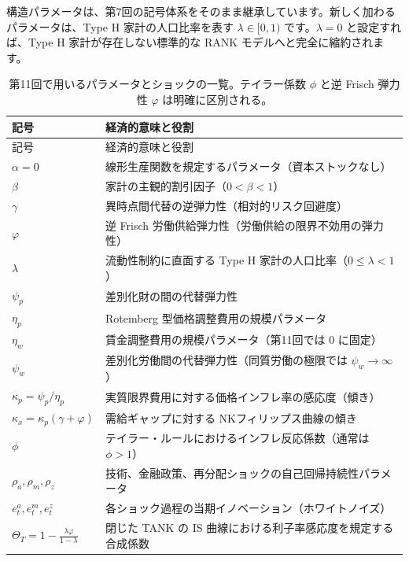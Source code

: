 \documentclass[
  japanese,
  lualatex,
  ja=standard,
  12pt,
  a4paper]{ltjsarticle}
\begin{document}
構造パラメータは、第7回の記号体系をそのまま継承しています。新しく加わるパラメータは、Type
H 家計の人口比率を表す \(\lambda \in [0, 1)\) です。\(\lambda=0\)
と設定すれば、Type H 家計が存在しない標準的な RANK
モデルへと完全に縮約されます。

\begin{longtable}[]{@{}
  >{\raggedright\arraybackslash}p{}
  >{\raggedright\arraybackslash}p{}@{}}
\caption{第11回で用いるパラメータとショックの一覧。テイラー係数 \(\phi\)
と逆 Frisch 弾力性 \(\varphi\) は明確に区別される。}\tabularnewline
\toprule\noalign{}
\begin{minipage}[b]{\linewidth}\raggedright
記号
\end{minipage} & \begin{minipage}[b]{\linewidth}\raggedright
経済的意味と役割
\end{minipage} \\
\midrule\noalign{}
\endfirsthead
\toprule\noalign{}
\begin{minipage}[b]{\linewidth}\raggedright
記号
\end{minipage} & \begin{minipage}[b]{\linewidth}\raggedright
経済的意味と役割
\end{minipage} \\
\midrule\noalign{}
\endhead
\bottomrule\noalign{}
\endlastfoot
\(\alpha=0\) & 線形生産関数を規定するパラメータ（資本ストックなし） \\
\(\beta\) & 家計の主観的割引因子（\(0<\beta<1\)） \\
\(\gamma\) & 異時点間代替の逆弾力性（相対的リスク回避度） \\
\(\varphi\) & 逆 Frisch
労働供給弾力性（労働供給の限界不効用の弾力性） \\
\(\lambda\) & 流動性制約に直面する Type H
家計の人口比率（\(0 \leq \lambda < 1\)） \\
\(\psi_p\) & 差別化財の間の代替弾力性 \\
\(\eta_p\) & Rotemberg 型価格調整費用の規模パラメータ \\
\(\eta_w\) & 賃金調整費用の規模パラメータ（第11回では \(0\) に固定） \\
\(\psi_w\) & 差別化労働間の代替弾力性（同質労働の極限では
\(\psi_w \to \infty\)） \\
\(\kappa_p = \psi_p / \eta_p\) &
実質限界費用に対する価格インフレ率の感応度（傾き） \\
\(\kappa_x = \kappa_p(\gamma+\varphi)\) & 需給ギャップに対する
NKフィリップス曲線の傾き \\
\(\phi\) & テイラー・ルールにおけるインフレ反応係数（通常は
\(\phi>1\)） \\
\(\rho_a, \rho_m, \rho_z\) &
技術、金融政策、再分配ショックの自己回帰持続性パラメータ \\
\(e_t^a, e_t^m, e_t^z\) &
各ショック過程の当期イノベーション（ホワイトノイズ） \\
\(\Theta_T = 1 - \frac{\lambda\varphi}{1-\lambda}\) & 閉じた TANK の IS
曲線における利子率感応度を規定する合成係数 \\
\end{longtable}
\end{document}
